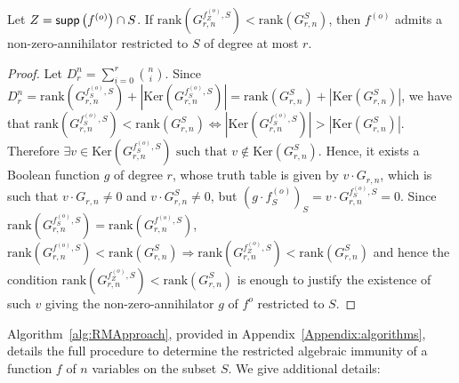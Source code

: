 \documentclass[11pt]{llncs}
\begin{document}
\begin{proposition}\label{prop:compareranks}
	Let $Z = \mathsf{supp}\left(f^{(o)}\right) \cap S$.
	If $\text{rank}\left(G^{f_{Z}^{(o)},S}_{r,n}\right) < \text{rank}(G^{S}_{r,n})$, then $f^{(o)}$ admits a non-zero-annihilator restricted to $S$ of degree at most $r$.
\end{proposition}

\begin{proof}
	Let $D_r^n = \sum_{i=0}^r \binom{n}{i}$. Since $D_r^n = \text{rank}(G^{f^{(o)}_S,S}_{r,n}) + |\text{Ker}(G^{f^{(o)}_S,S}_{r,n})| =  \text{rank}(G^{S}_{r,n}) + |\text{Ker}(G^{S}_{r,n})|$, we have that
	$\text{rank}(G^{f_S^{(o)},S}_{r,n}) < \text{rank}(G^{S}_{r,n}) \iff |\text{Ker}(G^{f_S^{(o)},S}_{r,n})| > |\text{Ker}(G^{S}_{r,n})|$. 
	Therefore $\exists v\in \text{Ker}(G^{f_S^{(o)},S}_{r,n}) \mbox{ such that }v\not\in \text{Ker}(G^{S}_{r,n})$. 
	Hence, it exists a Boolean function $g$ of degree $r$, whose truth table is given by $v \cdot G_{r,n}$, which is such that $v \cdot G_{r,n}\neq 0$ and $v \cdot G_{r,n}^{S}\neq 0$, but $(g \cdot f_S^{(o)})_S = v \cdot G_{r,n}^{f_S^{(o)},S} = 0$.
	Since $\text{rank}\left(G_{r,n}^{f_S^{(o)}, S}\right) = \text{rank}\left(G_{r,n}^{f^{(o)}, S}\right)$, $\text{rank}(G^{f^{(o)},S}_{r,n}) < \text{rank}(G^{S}_{r,n}) \Rightarrow \text{rank}(G^{f_Z^{(o)},S}_{r,n}) < \text{rank}(G^{S}_{r,n})$ and hence the condition $\text{rank}(G^{f_Z^{(o)},S}_{r,n}) < \text{rank}(G^{S}_{r,n})$ is enough to justify the existence of such $v$ giving the non-zero-annihilator $g$ of $f^{o}$ restricted to $S$.
\end{proof}


Algorithm~\ref{alg:RMApproach}, provided in Appendix~\ref{Appendix:algorithms}, details the full procedure to determine the restricted algebraic immunity of a function $f$ of $n$ variables on the subset $S$. 
We give additional details:
\end{document}
